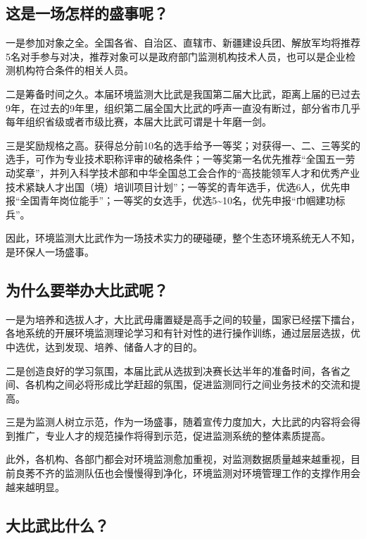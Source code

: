 \documentclass[
]{book}
\begin{document}
\hypertarget{ux8fd9ux662fux4e00ux573aux600eux6837ux7684ux76dbux4e8bux5462}{%
\subsection{这是一场怎样的盛事呢？}\label{ux8fd9ux662fux4e00ux573aux600eux6837ux7684ux76dbux4e8bux5462}}

一是参加对象之全。全国各省、自治区、直辖市、新疆建设兵团、解放军均将推荐5名对手参与对决，推荐对象可以是政府部门监测机构技术人员，也可以是企业检测机构符合条件的相关人员。

二是筹备时间之久。本届环境监测大比武是我国第二届大比武，距离上届的已过去9年，在过去的9年里，组织第二届全国大比武的呼声一直没有断过，部分省市几乎每年组织省级或者市级比赛，本届大比武可谓是十年磨一剑。

三是奖励规格之高。获得总分前10名的选手给予一等奖；对获得一、二、三等奖的选手，可作为专业技术职称评审的破格条件；一等奖第一名优先推荐``全国五一劳动奖章''，并列入科学技术部和中华全国总工会合作的``高技能领军人才和优秀产业技术紧缺人才出国（境）培训项目计划''；一等奖的青年选手，优选6人，优先申报``全国青年岗位能手''；一等奖的女选手，优选5\textasciitilde10名，优先申报``巾帼建功标兵''。

因此，环境监测大比武作为一场技术实力的硬碰硬，整个生态环境系统无人不知，是环保人一场盛事。

\hypertarget{ux4e3aux4ec0ux4e48ux8981ux4e3eux529eux5927ux6bd4ux6b66ux5462}{%
\subsection{为什么要举办大比武呢？}\label{ux4e3aux4ec0ux4e48ux8981ux4e3eux529eux5927ux6bd4ux6b66ux5462}}

一是为培养和选拔人才，大比武毋庸置疑是高手之间的较量，国家已经摆下擂台，各地系统的开展环境监测理论学习和有针对性的进行操作训练，通过层层选拔，优中选优，达到发现、培养、储备人才的目的。

二是创造良好的学习氛围，本届比武从选拔到决赛长达半年的准备时间，各省之间、各机构之间必将形成比学赶超的氛围，促进监测同行之间业务技术的交流和提高。

三是为监测人树立示范，作为一场盛事，随着宣传力度加大，大比武的内容将会得到推广，专业人才的规范操作将得到示范，促进监测系统的整体素质提高。

此外，各机构、各部门都会对环境监测愈加重视，对监测数据质量越来越重视，目前良莠不齐的监测队伍也会慢慢得到净化，环境监测对环境管理工作的支撑作用会越来越明显。

\hypertarget{ux5927ux6bd4ux6b66ux6bd4ux4ec0ux4e48}{%
\subsection{大比武比什么？}\label{ux5927ux6bd4ux6b66ux6bd4ux4ec0ux4e48}}
\end{document}
